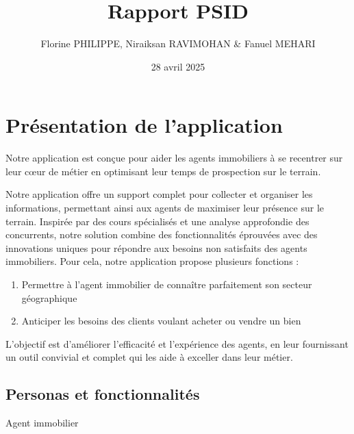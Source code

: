 \documentclass[a4paper, 12pt, twoside]{report}
\author{Florine PHILIPPE, Niraiksan RAVIMOHAN \& Fanuel MEHARI}
\title{Rapport PSID}
\date{28 avril 2025}
\begin{document}
\pagedegarde

\tableofcontents

\chapter{Présentation de l'application}

Notre application est conçue pour aider les agents immobiliers à se recentrer sur leur cœur de métier en optimisant leur temps de prospection sur le terrain. 

Notre application offre un support complet pour collecter et organiser les informations, permettant ainsi aux agents de maximiser leur présence sur le terrain. Inspirée par des cours spécialisés et une analyse approfondie des concurrents, notre solution combine des fonctionnalités éprouvées avec des innovations uniques pour répondre aux besoins non satisfaits des agents immobiliers. Pour cela, notre application propose plusieurs fonctions :

\begin{enumerate}
            \item Permettre à l’agent immobilier de connaître parfaitement son secteur géographique
            \item Anticiper les besoins des clients voulant acheter ou vendre un bien \\
\end{enumerate}

L'objectif est d'améliorer l'efficacité et l'expérience des agents, en leur fournissant un outil convivial et complet qui les aide à exceller dans leur métier.

\section{Personas et fonctionnalités}

Agent immobilier
\end{document}
